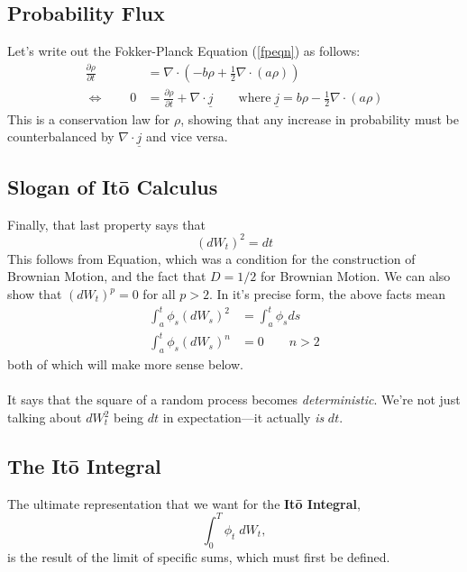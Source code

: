 \documentclass[12pt]{article}
\theoremstyle{plain}
\theoremstyle{definition}
\theoremstyle{remark}
\begin{document}
\subsection{Probability Flux}

Let's write out the Fokker-Planck Equation (\ref{fpeqn}) as follows:
\begin{align*}
  \frac{\partial\rho}{\partial t}
  &= \nabla \cdot \left( -b\rho + \frac{1}{2}\nabla \cdot (a\rho)\right)\\
  \Leftrightarrow\qquad
  0&=
  \frac{\partial\rho}{\partial t}
  + \nabla \cdot \underline{j}
  \qquad
  \text{where}\;
  \underline{j} = b\rho - \frac{1}{2}\nabla\cdot(a\rho)
\end{align*}
This is a conservation law for $\rho$, showing that any increase in
probability must be counterbalanced by $\nabla \cdot
\underline{j}$ and vice versa.


\clearpage
\subsection{Slogan of It\={o} Calculus}

Finally, that last property says that
\begin{equation}
    \label{slogan}
     (dW_t)^2 = dt
\end{equation}
This follows from Equation, which was a condition for
the construction of Brownian Motion, and the fact that $D=1/2$
for Brownian Motion. We can also show that $(dW_t)^p = 0$ for all $p>2$.
In it's precise form, the above facts mean
\begin{align*}
    \int^t_a \phi_s (dW_s)^2 &=  \int^t_a \phi_s ds \\
    \int^t_a \phi_s (dW_s)^n &= 0 \qquad n>2
\end{align*}
both of which will make more sense below.
\\
\\
It says that the square of a random process becomes \emph{deterministic}.
We're not just talking about $dW^2_t$ being $dt$ in expectation---it
actually \emph{is} $dt$.




\subsection{The It\={o} Integral}

The ultimate representation that we want for the \textbf{It\={o}
Integral},
   \[ \int_0^T \phi_t \;dW_t, \]
is the result of the limit of specific sums, which must first be defined.
\end{document}
